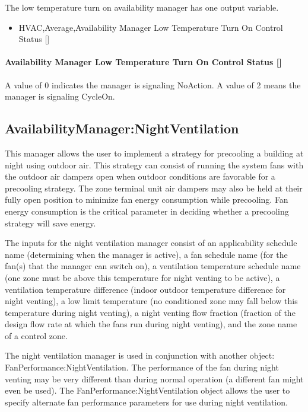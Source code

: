 The low temperature turn on availability manager has one output variable.

\begin{itemize}
\tightlist
\item
  HVAC,Average,Availability Manager Low Temperature Turn On Control Status {[]}
\end{itemize}

\paragraph{Availability Manager Low Temperature Turn On Control Status {[]}}\label{availability-manager-low-temperature-turn-on-control-status}

A value of 0 indicates the manager is signaling NoAction. A value of 2 means the manager is signaling CycleOn.

\subsection{AvailabilityManager:NightVentilation}\label{availabilitymanagernightventilation}

This manager allows the user to implement a strategy for precooling a building at night using outdoor air. This strategy can consist of running the system fans with the outdoor air dampers open when outdoor conditions are favorable for a precooling strategy. The zone terminal unit air dampers may also be held at their fully open position to minimize fan energy consumption while precooling. Fan energy consumption is the critical parameter in deciding whether a precooling strategy will save energy.

The inputs for the night ventilation manager consist of an applicability schedule name (determining when the manager is active), a fan schedule name (for the fan(s) that the manager can switch on), a ventilation temperature schedule name (one zone must be above this temperature for night venting to be active), a ventilation temperature difference (indoor outdoor temperature difference for night venting), a low limit temperature (no conditioned zone may fall below this temperature during night venting), a night venting flow fraction (fraction of the design flow rate at which the fans run during night venting), and the zone name of a control zone.

The night ventilation manager is used in conjunction with another object: FanPerformance:NightVentilation. The performance of the fan during night venting may be very different than during normal operation (a different fan might even be used). The FanPerformance:NightVentilation object allows the user to specify alternate fan performance parameters for use during night ventilation.

